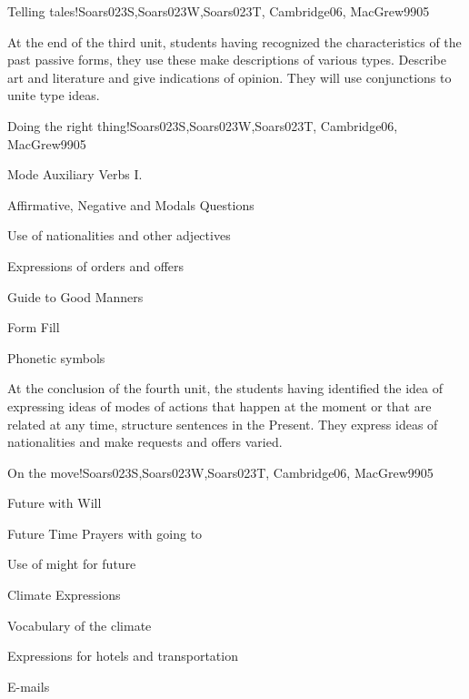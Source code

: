 \begin{syllabus}
\begin{unit}{Telling tales!}{}{Soars023S,Soars023W,Soars023T, Cambridge06, MacGrew99}{0}{5}
   \begin{learningoutcomes}
      \item At the end of the third unit, students having recognized the characteristics of the past passive forms, they use these make descriptions of various types. Describe art and literature and give indications of opinion. They will use conjunctions to unite type ideas.
   \end{learningoutcomes}
\end{unit}

\begin{unit}{Doing the right thing!}{}{Soars023S,Soars023W,Soars023T, Cambridge06, MacGrew99}{0}{5}
   \begin{topics}
      \item Mode Auxiliary Verbs I.
      \item Affirmative, Negative and Modals Questions
      \item Use of nationalities and other adjectives
      \item Expressions of orders and offers
      \item Guide to Good Manners
      \item Form Fill
      \item Phonetic symbols
   \end{topics}

   \begin{learningoutcomes}
      \item At the conclusion of the fourth unit, the students having identified the idea of expressing ideas of modes of actions that happen at the moment or that are related at any time, structure sentences in the Present. They express ideas of nationalities and make requests and offers varied.
   \end{learningoutcomes}

\end{unit}

\begin{unit}{On the move!}{}{Soars023S,Soars023W,Soars023T, Cambridge06, MacGrew99}{0}{5}
   \begin{topics}
      \item Future with Will
      \item Future Time Prayers with going to
      \item Use of might for future
      \item Climate Expressions
      \item Vocabulary of the climate
      \item Expressions for hotels and transportation
      \item E-mails
   \end{topics}


\end{unit}
\end{syllabus}
